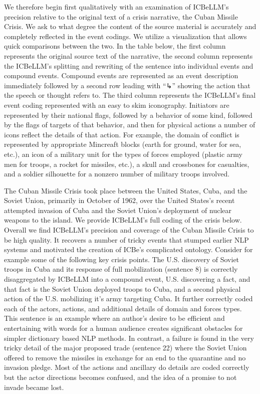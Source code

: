 \documentclass[
]{article}
\begin{document}
We therefore begin first qualitatively with an examination of ICBeLLM's
precision relative to the original text of a crisis narrative, the Cuban
Missile Crisis. We ask to what degree the content of the source material
is accurately and completely reflected in the event codings. We utilize
a visualization that allows quick comparisons between the two. In the
table below, the first column represents the original source text of the
narrative, the second column represents the ICBeLLM's splitting and
rewriting of the sentence into individual events and compound events.
Compound events are represented as an event description immediately
followed by a second row leading with ``↳'' showing the action that the
speech or thought refers to. The third column represents the ICBeLLM's
final event coding represented with an easy to skim iconography.
Initiators are represented by their national flags, followed by a
behavior of some kind, followed by the flags of targets of that
behavior, and then for physical actions a number of icons reflect the
details of that action. For example, the domain of conflict is
represented by appropriate Mincreaft blocks (earth for ground, water for
sea, etc.), an icon of a military unit for the types of forces employed
(plastic army men for troops, a rocket for missiles, etc.), a skull and
crossbones for casualties, and a soldier silhouette for a nonzero number
of military troops involved.

The Cuban Missile Crisis took place between the United States, Cuba, and
the Soviet Union, primarily in October of 1962, over the United States's
recent attempted invasion of Cuba and the Soviet Union's deployment of
nuclear weapons to the island. We provide ICBeLLM's full coding of the
crisis below. Overall we find ICBeLLM's precision and coverage of the
Cuban Missile Crisis to be high quality. It recovers a number of tricky
events that stumped earlier NLP systems and motivated the creation of
ICBe's complicated ontology. Consider for example some of the following
key crisis points. The U.S. discovery of Soviet troops in Cuba and its
response of full mobilization (sentence 8) is correctly disaggregated by
ICBeLLM into a compound event, U.S. discovering a fact, and that fact is
the Soviet Union deployed troops to Cuba, and a second physical action
of the U.S. mobilizing it's army targeting Cuba. It further correctly
coded each of the actors, actions, and additional details of domain and
forces types. This sentence is an example where an author's desire to be
efficient and entertaining with words for a human audience creates
significant obstacles for simpler dictionary based NLP methods. In
contrast, a failure is found in the very tricky detail of the major
proposed trade (sentence 22) where the Soviet Union offered to remove
the missiles in exchange for an end to the quarantine and no invasion
pledge. Most of the actions and ancillary do details are coded correctly
but the actor directions becomes confused, and the idea of a promise to
not invade became lost.
\end{document}
